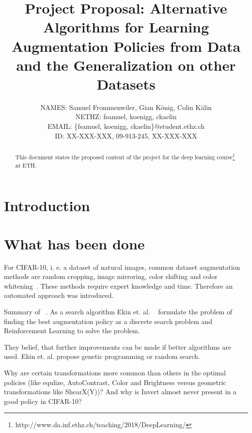 \documentclass[10pt,twocolumn,letterpaper]{article}
\begin{document}
\title{Project Proposal: Alternative Algorithms for Learning Augmentation Policies from Data and the Generalization on other Datasets}

\author{
    	\small{NAMES: Samuel Frommenwiler, Gian K\"onig, Colin K\"alin} \\
   	\small{NETHZ: fsamuel, koenigg, ckaelin}\\
	\small{EMAIL: \{fsamuel, koenigg, ckaelin\}$@$student.ethz.ch}\\
    	\small{ID: XX-XXX-XXX, 09-913-245, XX-XXX-XXX}
}

\maketitle

\begin{abstract}
   This document states the proposed content of the project for the deep learning course\footnote{http://www.da.inf.ethz.ch/teaching/2018/DeepLearning/} at ETH.
\end{abstract}

\section{Introduction}

\section{What has been done}

For CIFAR-10, i. e. a dataset of natural images, common dataset augmentation methods are random cropping, image mirroring, color shifting and color whitening~\cite{Ekin}. These methods require expert knowledge and time. Therefore an automated approach was introduced.

Summary of ~\cite{Ekin}. As a search algorithm Ekin et. al. ~\cite{Ekin} formulate the problem of finding the best augmentation policy as a discrete search problem and Reinforcement Learning to solve the problem.

They belief, that further improvements can be made if better algorithms are used. Ekin et. al. propose genetic programming or random search.

Why are certain transformations more common than others in the optimal policies (like equlize, AutoContrast, Color and Brightness versus geometric transformations like ShearX(Y))? And why is Invert almost never present in a good policy in CIFAR-10?
\end{document}
